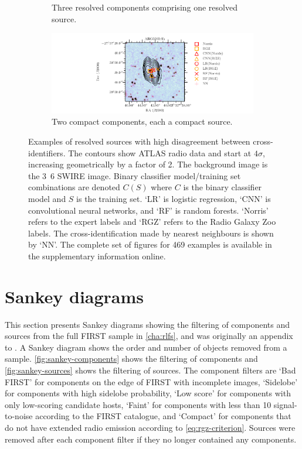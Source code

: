 \begin{figure}
\begin{subfigure}{0.45\textwidth}
            \caption{Three resolved components comprising one resolved source.}
        \end{subfigure}
        \begin{subfigure}{0.9\textwidth}
            \includegraphics[width=\textwidth]{atlas-images/examples_all/example_sorted_0_306.pdf}
            \caption{Two compact components, each a compact source.}
        \end{subfigure}
        \caption[Examples of resolved sources with high disagreement between cross-identifiers.]{\label{fig:examples} Examples of resolved sources with high disagreement between cross-identifiers. The contours show ATLAS radio data and start at $4\sigma$, increasing geometrically by a factor of 2. The background image is the \unit{3.6}{\micro\meter} SWIRE image. Binary classifier model/training set combinations are denoted $C(S)$ where $C$ is the binary classifier model and $S$ is the training set. `LR' is logistic regression, `CNN' is convolutional neural networks, and `RF' is random forests. `Norris' refers to the expert labels and `RGZ' refers to the Radio Galaxy Zoo labels. The cross-identification made by nearest neighbours is shown by `NN'. The complete set of figures for 469 examples is available in the supplementary information online.}
    \end{figure}


  \section{Sankey diagrams}
  \label{sec:rlfs-sankey}

    This section presents Sankey diagrams showing the filtering of components and sources from the full FIRST sample in \autoref{cha:rlfs}, and was originally an appendix to \citet{alger21rlfs}. A Sankey diagram shows the order and number of objects removed from a sample. \autoref{fig:sankey-components} shows the filtering of components and \autoref{fig:sankey-sources} shows the filtering of sources. The component filters are `Bad FIRST' for components on the edge of FIRST with incomplete images, `Sidelobe' for components with high sidelobe probability, `Low score' for components with only low-scoring candidate hosts, `Faint' for components with less than 10 signal-to-noise according to the FIRST catalogue, and `Compact' for components that do not have extended radio emission according to \autoref{eq:rgz-criterion}. Sources were removed after each component filter if they no longer contained any components.

